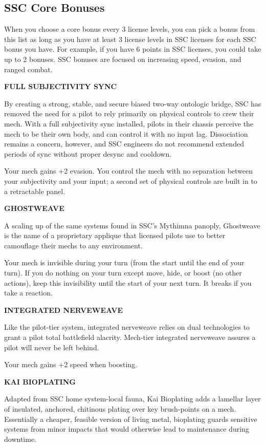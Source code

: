 \subsection{SSC Core Bonuses}


When you choose a core bonus every 3 license levels, you can pick a bonus from this list as long as you have at least 3 license levels in SSC licenses for each SSC bonus you have. For example, if you have 6 points in SSC licenses, you could take up to 2 bonuses. SSC bonuses are focused on increasing speed, evasion, and ranged combat.


\textbf{FULL SUBJECTIVITY SYNC}

By creating a strong, stable, and secure biased two-way ontologic bridge, SSC has removed the need for a pilot to rely primarily on physical controls to crew their mech. With a full subjectivity sync installed, pilots in their chassis perceive the mech to be their own body, and can control it with no input lag. Dissociation remains a concern, however, and SSC engineers do not recommend extended periods of sync without proper desync and cooldown.

Your mech gains +2 evasion. You control the mech with no separation between your subjectivity and your input; a second set of physical controls are built in to a retractable panel.


\textbf{GHOSTWEAVE}

A scaling up of the same systems found in SSC's Mythimna panoply, Ghostweave is the name of a proprietary applique that licensed pilots use to better camouflage their mechs to any environment.

Your mech is invisible during your turn (from the start until the end of your turn). If you do nothing on your turn except move, hide, or boost (no other actions), keep this invisibility until the start of your next turn. It breaks if you take a reaction.


\textbf{INTEGRATED NERVEWEAVE}

Like the pilot-tier system, integrated nerveweave relies on dual technologies to grant a pilot total battlefield alacrity. Mech-tier integrated nerveweave assures a pilot will never be left behind.

Your mech gains +2 speed when boosting.


\textbf{KAI BIOPLATING}

Adapted from SSC home system-local fauna, Kai Bioplating adds a lamellar layer of insulated, anchored, chitinous plating over key brush-points on a mech. Essentially a cheaper, feasible version of living metal, bioplating guards sensitive systems from minor impacts that would otherwise lead to maintenance during downtime.

